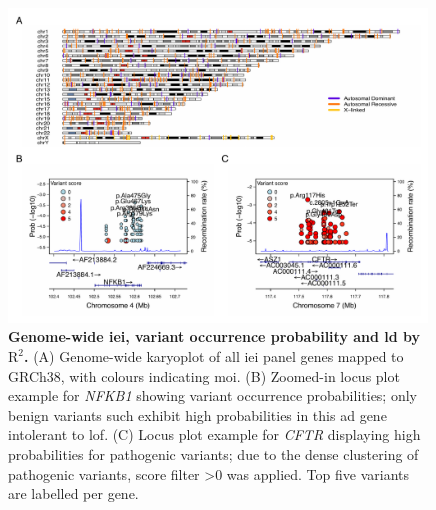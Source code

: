 \begin{figure}[ht]
  \centering
  \includegraphics[width=0.99\textwidth]{../images/karyo_locusplot_merged.pdf}
  \caption{\textbf{Genome-wide \ac{iei}, variant occurrence probability and \ac{ld} by $\text{R}^2$.} (A) Genome-wide karyoplot of all \ac{iei} panel genes mapped to GRCh38, with colours indicating \ac{moi}. (B) Zoomed-in locus plot example for \textit{NFKB1} showing variant occurrence probabilities; only benign variants such exhibit high probabilities in this \ac{ad} gene intolerant to \ac{lof}. (C) Locus plot example for \textit{CFTR} displaying high probabilities for pathogenic variants; due to the dense clustering of pathogenic variants, score filter >0 was applied. Top five variants are labelled per gene.}
  \label{fig:karyo_locusplot_merged}
\end{figure}

\FloatBarrier

